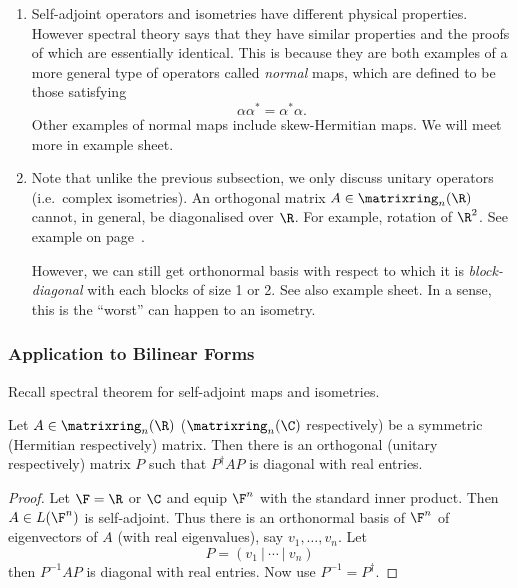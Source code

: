 \documentclass[a4paper]{article}
\newcommand*{\M}{\matrixring}
\theoremstyle{definition}
\begin{document}
\begin{remark}\leavevmode
  \begin{enumerate}
  \item Self-adjoint operators and isometries have different physical properties. However spectral theory says that they have similar properties and the proofs of which are essentially identical. This is because they are both examples of a more general type of operators called \emph{normal} maps, which are defined to be those satisfying
    \[
      \alpha \alpha^* = \alpha^* \alpha.
    \]
    Other examples of normal maps include skew-Hermitian maps. We will meet more in example sheet.
  \item Note that unlike the previous subsection, we only discuss unitary operators (i.e.\ complex isometries). An orthogonal matrix \(A \in \M_n(\R)\) cannot, in general, be diagonalised over \(\R\). For example, rotation of \(\R^2\). See example on page~\pageref{eg:rotation}.

    However, we can still get orthonormal basis with respect to which it is \emph{block-diagonal} with each blocks of size 1 or 2. See also example sheet. In a sense, this is the ``worst'' can happen to an isometry.
  \end{enumerate}
\end{remark}

\subsubsection{Application to Bilinear Forms}

Recall spectral theorem for self-adjoint maps and isometries.

\begin{corollary}
  Let \(A \in \M_n(\R)\) (\(\M_n(\C)\) respectively) be a symmetric (Hermitian respectively) matrix. Then there is an orthogonal (unitary respectively) matrix \(P\) such that \(P^\dag AP\) is diagonal with real entries.
\end{corollary}

\begin{proof}
  Let \(\F = \R\) or \(\C\) and equip \(\F^n\) with the standard inner product. Then \(A \in L(\F^n)\) is self-adjoint. Thus there is an orthonormal basis of \(\F^n\) of eigenvectors of \(A\) (with real eigenvalues), say \(v_1, \dots, v_n\). Let
  \[
    P = (v_1 \:|\: \cdots \:|\: v_n)
  \]
  then \(P^{-1}AP\) is diagonal with real entries. Now use \(P^{-1} = P^\dag\).
\end{proof}
\end{document}
